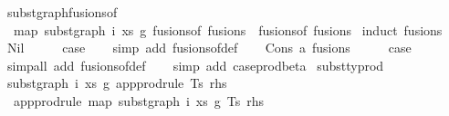 \begin{isabellebody}
\endisatagproof
{\isafoldproof}%
%
\isadelimproof
\isanewline
%
\endisadelimproof
\isanewline
\isanewline
{}\isamarkupfalse%
\ subst{\isacharunderscore}{\kern0pt}graph{\isacharunderscore}{\kern0pt}fusions{\isacharunderscore}{\kern0pt}of{\isacharcolon}{\kern0pt}\isanewline
\ \ {\isachardoublequoteopen}map\ {\isacharparenleft}{\kern0pt}subst{\isacharunderscore}{\kern0pt}graph\ i\ xs\ g{}{\isacharparenright}{\kern0pt}\ {\isacharparenleft}{\kern0pt}fusions{\isacharunderscore}{\kern0pt}of\ fusions{\isacharparenright}{\kern0pt}\ {\isacharequal}{\kern0pt}\ fusions{\isacharunderscore}{\kern0pt}of\ fusions{\isachardoublequoteclose}\isanewline
%
\isadelimproof
%
\endisadelimproof
%
\isatagproof
{}\isamarkupfalse%
\ {\isacharparenleft}{\kern0pt}induct\ fusions{\isacharparenright}{\kern0pt}\isanewline
\ \ \isamarkupfalse%
\ Nil\isanewline
\ \ \isamarkupfalse%
\ \isamarkupfalse%
\ {\isacharquery}{\kern0pt}case\isanewline
\ \ \isamarkupfalse%
\ {\isacharparenleft}{\kern0pt}simp\ add{\isacharcolon}{\kern0pt}\ fusions{\isacharunderscore}{\kern0pt}of{\isacharunderscore}{\kern0pt}def{\isacharparenright}{\kern0pt}\isanewline
{}\isamarkupfalse%
\isanewline
\ \ \isamarkupfalse%
\ {\isacharparenleft}{\kern0pt}Cons\ a\ fusions{\isacharparenright}{\kern0pt}\isanewline
\ \ \isamarkupfalse%
\ \isamarkupfalse%
\ {\isacharquery}{\kern0pt}case\isanewline
\ \ \isamarkupfalse%
\ {\isacharparenleft}{\kern0pt}simp{\isacharunderscore}{\kern0pt}all\ add{\isacharcolon}{\kern0pt}\ fusions{\isacharunderscore}{\kern0pt}of{\isacharunderscore}{\kern0pt}def{\isacharparenright}{\kern0pt}\isanewline
\ \ \isamarkupfalse%
\ {\isacharparenleft}{\kern0pt}simp\ add{\isacharcolon}{\kern0pt}\ case{\isacharunderscore}{\kern0pt}prod{\isacharunderscore}{\kern0pt}beta{\isacharparenright}{\kern0pt}\isanewline
{}\isamarkupfalse%
%
\endisatagproof
{\isafoldproof}%
%
\isadelimproof
\isanewline
%
\endisadelimproof
\isanewline
\isanewline
{}\isamarkupfalse%
\ subst{\isacharunderscore}{\kern0pt}typrod{\isacharcolon}{\kern0pt}\isanewline
\ {\isachardoublequoteopen}subst{\isacharunderscore}{\kern0pt}graph\ i\ xs\ g{}\ {\isacharparenleft}{\kern0pt}app{\isacharunderscore}{\kern0pt}prodrule\ Ts\ rhs{\isacharparenright}{\kern0pt}\ {\isacharequal}{\kern0pt}\isanewline
\ \ app{\isacharunderscore}{\kern0pt}prodrule\ {\isacharparenleft}{\kern0pt}map\ {\isacharparenleft}{\kern0pt}subst{\isacharunderscore}{\kern0pt}graph\ i\ xs\ g{}{\isacharparenright}{\kern0pt}\ Ts{\isacharparenright}{\kern0pt}\ rhs{\isachardoublequoteclose}\isanewline

\end{isabellebody}
